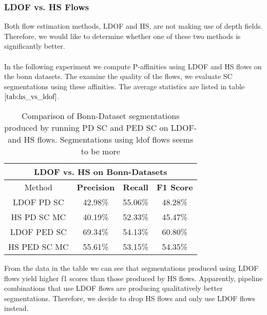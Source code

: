 \subsubsection{LDOF vs. HS Flows}
Both flow estimation methods, LDOF and HS, are not making use of depth fields. Therefore, we would like to determine whether one of these two methods is significantly better. \\ \\
In the following experiment we compute P-affinities using LDOF and HS flows on the bonn datasets. The examine the quality of the flows, we evaluate SC segmentations using these affinities. The average statistics are listed in table $\ref{tab:hs_vs_ldof}$.
\begin{table}[H]
\centering
\begin{tabular}{|c|c|c|c|}
\hline
\multicolumn{4}{|c|}{LDOF vs. HS on Bonn-Datasets}                        \\ \hline
Method & \textbf{Precision} & \textbf{Recall} & \textbf{F1 Score} \\ \hline
LDOF PD SC & 42.98\%   & 55.06\%     & 48.28\%  \\ \hline
HS PD SC MC & 40.19\%   & 52.33\%     & 45.47\%  \\ \hline
LDOF PED SC & 69.34\%   & 54.13\%     & 60.80\%  \\ \hline
HS PED SC MC & 55.61\%   & 53.15\%     & 54.35\%  \\ \hline             
\end{tabular}
\caption[LDOF vs. HS Flows]{Comparison of Bonn-Dataset segmentations produced by running PD SC and PED SC on LDOF- and HS flows. Segmentations using ldof flows seems to be more }
\label{tab:hs_vs_ldof}
\end{table}
From the data in the table we can see that segmentations produced using LDOF flows yield higher f1 scores than those produced by HS flows. Apparently, pipeline combinations that use LDOF flows are producing qualitatively better segmentations. Therefore, we decide to drop HS flows and only use LDOF flows instead.

